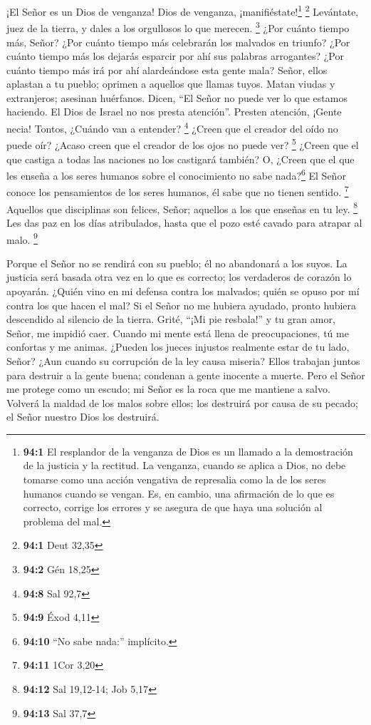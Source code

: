  ¡El Señor es un Dios de venganza! Dios de venganza,
¡manifiéstate!\footnote{\textbf{94:1} El resplandor de la venganza de
  Dios es un llamado a la demostración de la justicia y la rectitud. La
  venganza, cuando se aplica a Dios, no debe tomarse como una acción
  vengativa de represalia como la de los seres humanos cuando se vengan.
  Es, en cambio, una afirmación de lo que es correcto, corrige los
  errores y se asegura de que haya una solución al problema del mal.}
\footnote{\textbf{94:1} Deut 32,35}  Levántate, juez de la
tierra, y dales a los orgullosos lo que merecen. \footnote{\textbf{94:2}
  Gén 18,25}  ¿Por cuánto tiempo más, Señor? ¿Por cuánto
tiempo más celebrarán los malvados en triunfo?  ¿Por
cuánto tiempo más los dejarás esparcir por ahí sus palabras arrogantes?
¿Por cuánto tiempo más irá por ahí alardeándose esta gente mala?
 Señor, ellos aplastan a tu pueblo; oprimen a aquellos que
llamas tuyos.  Matan viudas y extranjeros; asesinan
huérfanos.  Dicen, ``El Señor no puede ver lo que estamos
haciendo. El Dios de Israel no nos presta atención''. 
Presten atención, ¡Gente necia! Tontos, ¿Cuándo van a entender?
\footnote{\textbf{94:8} Sal 92,7}  ¿Creen que el creador
del oído no puede oír? ¿Acaso creen que el creador de los ojos no puede
ver? \footnote{\textbf{94:9} Éxod 4,11}  ¿Creen que el
que castiga a todas las naciones no los castigará también? O, ¿Creen que
el que les enseña a los seres humanos sobre el conocimiento no sabe
nada?\footnote{\textbf{94:10} ``No sabe nada:'' implícito.}
 El Señor conoce los pensamientos de los seres humanos,
él sabe que no tienen sentido. \footnote{\textbf{94:11} 1Cor 3,20}
 Aquellos que disciplinas son felices, Señor; aquellos a
los que enseñas en tu ley. \footnote{\textbf{94:12} Sal 19,12-14; Job
  5,17}  Les das paz en los días atribulados, hasta que
el pozo esté cavado para atrapar al malo. \footnote{\textbf{94:13} Sal
  37,7}

 Porque el Señor no se rendirá con su pueblo; él no
abandonará a los suyos.  La justicia será basada otra vez
en lo que es correcto; los verdaderos de corazón lo apoyarán.
 ¿Quién vino en mi defensa contra los malvados; quién se
opuso por mí contra los que hacen el mal?  Si el Señor no
me hubiera ayudado, pronto hubiera descendido al silencio de la tierra.
 Grité, ``¡Mi pie resbala!'' y tu gran amor, Señor, me
impidió caer.  Cuando mi mente está llena de
preocupaciones, tú me confortas y me animas.  ¿Pueden los
jueces injustos realmente estar de tu lado, Señor? ¿Aun cuando su
corrupción de la ley causa miseria?  Ellos trabajan
juntos para destruir a la gente buena; condenan a gente inocente a
muerte.  Pero el Señor me protege como un escudo; mi
Señor es la roca que me mantiene a salvo.  Volverá la
maldad de los malos sobre ellos; los destruirá por causa de su pecado;
el Señor nuestro Dios los destruirá.

